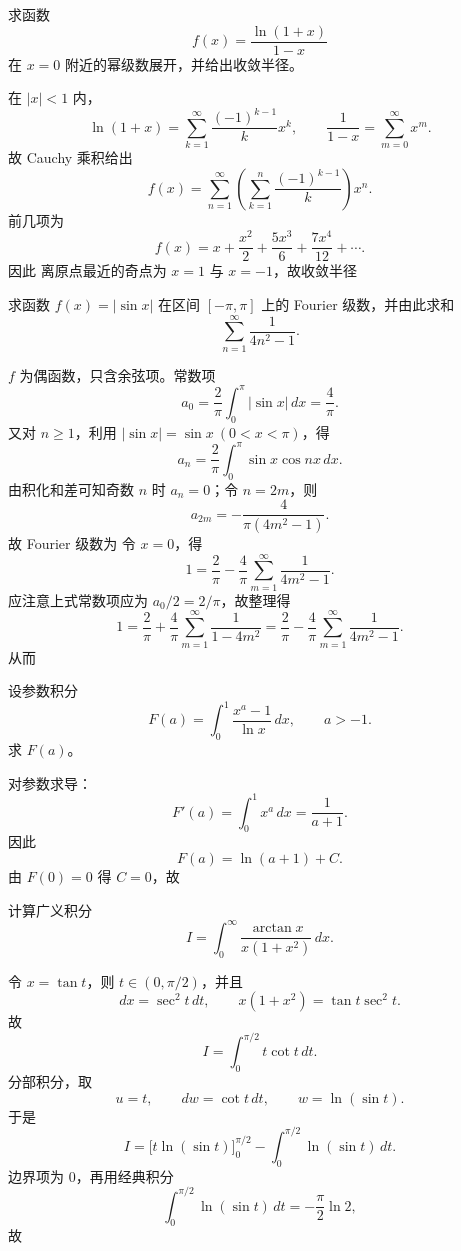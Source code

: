 \begin{question}
求函数
\[
f(x)=\frac{\ln(1+x)}{1-x}
\]
在 $x=0$ 附近的幂级数展开，并给出收敛半径。
\begin{solution}

在 $|x|<1$ 内，
\[
\ln(1+x)=\sum_{k=1}^{\infty}\frac{(-1)^{k-1}}{k}x^k,
\qquad
\frac{1}{1-x}=\sum_{m=0}^{\infty}x^m.
\]
故 Cauchy 乘积给出
\[
f(x)=\sum_{n=1}^{\infty}\left(\sum_{k=1}^{n}\frac{(-1)^{k-1}}{k}\right)x^n.
\]
前几项为
\[
f(x)=x+\frac{x^2}{2}+\frac{5x^3}{6}+\frac{7x^4}{12}+\cdots.
\]
因此
离原点最近的奇点为 $x=1$ 与 $x=-1$，故收敛半径
\end{solution}
\end{question}

\begin{question}
求函数 $f(x)=|\sin x|$ 在区间 $[-\pi,\pi]$ 上的 Fourier 级数，并由此求和
\[
\sum_{n=1}^{\infty}\frac{1}{4n^2-1}.
\]
\begin{solution}

$f$ 为偶函数，只含余弦项。常数项
\[
a_0=\frac{2}{\pi}\int_0^{\pi}|\sin x|\,dx=\frac{4}{\pi}.
\]
又对 $n\ge1$，利用 $|\sin x|=\sin x\ (0<x<\pi)$，得
\[
a_n=\frac{2}{\pi}\int_0^{\pi}\sin x\cos nx\,dx.
\]
由积化和差可知奇数 $n$ 时 $a_n=0$；令 $n=2m$，则
\[
a_{2m}=-\frac{4}{\pi(4m^2-1)}.
\]
故 Fourier 级数为
令 $x=0$，得
\[
1=\frac{2}{\pi}-\frac{4}{\pi}\sum_{m=1}^{\infty}\frac{1}{4m^2-1}.
\]
应注意上式常数项应为 $a_0/2=2/\pi$，故整理得
\[
1=\frac{2}{\pi}+\frac{4}{\pi}\sum_{m=1}^{\infty}\frac{1}{1-4m^2}
=\frac{2}{\pi}-\frac{4}{\pi}\sum_{m=1}^{\infty}\frac{1}{4m^2-1}.
\]
从而
\end{solution}
\end{question}

\begin{question}
设参数积分
\[
F(a)=\int_0^1 \frac{x^a-1}{\ln x}\,dx,
\qquad a>-1.
\]
求 $F(a)$。
\begin{solution}

对参数求导：
\[
F'(a)=\int_0^1 x^a\,dx=\frac{1}{a+1}.
\]
因此
\[
F(a)=\ln(a+1)+C.
\]
由 $F(0)=0$ 得 $C=0$，故
\end{solution}
\end{question}

\begin{question}
计算广义积分
\[
I=\int_0^{\infty}\frac{\arctan x}{x(1+x^2)}\,dx.
\]
\begin{solution}

令 $x=\tan t$，则 $t\in(0,\pi/2)$，并且
\[
dx=\sec^2 t\,dt,
\qquad x(1+x^2)=\tan t\sec^2 t.
\]
故
\[
I=\int_0^{\pi/2} t\cot t\,dt.
\]
分部积分，取
\[
u=t,
\qquad dw=\cot t\,dt,
\qquad w=\ln(\sin t).
\]
于是
\[
I=\bigl[t\ln(\sin t)\bigr]_0^{\pi/2}-\int_0^{\pi/2}\ln(\sin t)\,dt.
\]
边界项为 $0$，再用经典积分
\[
\int_0^{\pi/2}\ln(\sin t)\,dt=-\frac{\pi}{2}\ln 2,
\]
故
\end{solution}
\end{question}



